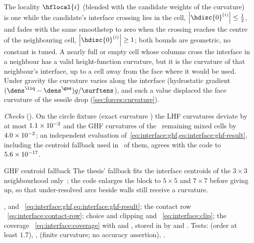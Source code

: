 The locality $\hflocal{i}$ (blended with the candidate weights of the
curvature) is one while the candidate's interface crossing lies in the cell,
$\abs{\hdisc{0}^{(i)}}\le\frac12$, and fades with the same smoothstep to zero
when the crossing reaches the centre of the neighbouring cell,
$\abs{\hdisc{0}^{(i)}}\ge1$; both bounds are geometric, no constant is tuned. A
nearly full or empty cell whose columns cross the interface in a neighbour has
a valid height-function curvature, but it is the curvature of that
neighbour's interface, up to a cell away from the face where it would be
used. Under gravity the curvature varies along the interface (hydrostatic
gradient $(\dens^{\liq}-\dens^{\gas})g/\surftens$), and such a value displaced the face
curvature of the sessile drop (\cref{sec:forces:curvature}).

\emph{Checks} (). On the circle fixture (exact
curvature \chkCircleKappa) the LHF curvatures deviate by at most $1.1\times10^{-2}$ and
the GHF curvatures of the \chkWyCells\ remaining mixed cells by $4.0\times10^{-2}$;
an independent evaluation of~\cref{eq:interface:ghf,eq:interface:ghf-result},
including the centroid fallback used in \chkGhfFallbacks\ of them, agrees with
the code to $5.6\times10^{-17}$.

\begin{deviation}{GHF centroid fallback}
The thesis' fallback fits the interface centroids of the $3\times3$ neighbourhood
only~; the code enlarges the block to $5\times5$ and $7\times7$
before giving up, so that under-resolved arcs beside walls still receive a
curvature.
\end{deviation}

\begin{implnote}
,
 and
~\cref{eq:interface:ghf,eq:interface:ghf-result};
the contact row
~\cref{eq:interface:contact-row};
choice and clipping
 and
~\cref{eq:interface:clip};
the coverage ~\cref{eq:interface:coverage}
with  and
,
stored in  by
 and
.
Tests: 
(order at least $1.7$),
,
(finite curvature; no accuracy assertion),
.
\end{implnote}

